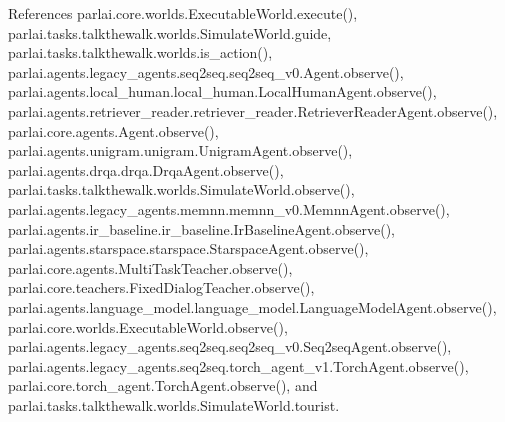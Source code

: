 References parlai.\+core.\+worlds.\+Executable\+World.\+execute(), parlai.\+tasks.\+talkthewalk.\+worlds.\+Simulate\+World.\+guide, parlai.\+tasks.\+talkthewalk.\+worlds.\+is\+\_\+action(), parlai.\+agents.\+legacy\+\_\+agents.\+seq2seq.\+seq2seq\+\_\+v0.\+Agent.\+observe(), parlai.\+agents.\+local\+\_\+human.\+local\+\_\+human.\+Local\+Human\+Agent.\+observe(), parlai.\+agents.\+retriever\+\_\+reader.\+retriever\+\_\+reader.\+Retriever\+Reader\+Agent.\+observe(), parlai.\+core.\+agents.\+Agent.\+observe(), parlai.\+agents.\+unigram.\+unigram.\+Unigram\+Agent.\+observe(), parlai.\+agents.\+drqa.\+drqa.\+Drqa\+Agent.\+observe(), parlai.\+tasks.\+talkthewalk.\+worlds.\+Simulate\+World.\+observe(), parlai.\+agents.\+legacy\+\_\+agents.\+memnn.\+memnn\+\_\+v0.\+Memnn\+Agent.\+observe(), parlai.\+agents.\+ir\+\_\+baseline.\+ir\+\_\+baseline.\+Ir\+Baseline\+Agent.\+observe(), parlai.\+agents.\+starspace.\+starspace.\+Starspace\+Agent.\+observe(), parlai.\+core.\+agents.\+Multi\+Task\+Teacher.\+observe(), parlai.\+core.\+teachers.\+Fixed\+Dialog\+Teacher.\+observe(), parlai.\+agents.\+language\+\_\+model.\+language\+\_\+model.\+Language\+Model\+Agent.\+observe(), parlai.\+core.\+worlds.\+Executable\+World.\+observe(), parlai.\+agents.\+legacy\+\_\+agents.\+seq2seq.\+seq2seq\+\_\+v0.\+Seq2seq\+Agent.\+observe(), parlai.\+agents.\+legacy\+\_\+agents.\+seq2seq.\+torch\+\_\+agent\+\_\+v1.\+Torch\+Agent.\+observe(), parlai.\+core.\+torch\+\_\+agent.\+Torch\+Agent.\+observe(), and parlai.\+tasks.\+talkthewalk.\+worlds.\+Simulate\+World.\+tourist.


